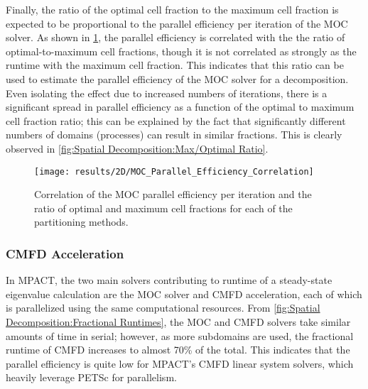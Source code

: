 {{{{        Finally, the ratio of the optimal cell fraction to the maximum cell fraction is expected to be proportional to the parallel efficiency per iteration of the \ac{MOC} solver.
        As shown in \cref{fig:Spatial Decomposition:MOC Parallel Efficiency Correlation}, the parallel efficiency is correlated with the the ratio of optimal-to-maximum cell fractions, though it is not correlated as strongly as the runtime with the maximum cell fraction.
        This indicates that this ratio can be used to estimate the parallel efficiency of the \ac{MOC} solver for a decomposition.
        Even isolating the effect due to increased numbers of iterations, there is a significant spread in parallel efficiency as a function of the optimal to maximum cell fraction ratio; this can be explained by the fact that significantly different numbers of domains (processes) can result in similar fractions.
        This is clearly observed in \cref{fig:Spatial Decomposition:Max/Optimal Ratio}.

        \begin{figure}
          \centering
          \texttt{[image: results/2D/MOC\_Parallel\_Efficiency\_Correlation]}
          \caption{Correlation of the \ac{MOC} parallel efficiency per iteration and the ratio of optimal and maximum cell fractions for each of the partitioning methods. \label{fig:Spatial Decomposition:MOC Parallel Efficiency Correlation}}
        \end{figure}
      }
      \subsubsection{CMFD Acceleration}{\label{sssec:CMFD Acceleration}
        In MPACT, the two main solvers contributing to runtime of a steady-state eigenvalue calculation are the \ac{MOC} solver and \ac{CMFD} acceleration, each of which is parallelized using the same computational resources.
        From \cref{fig:Spatial Decomposition:Fractional Runtimes}, the \ac{MOC} and \ac{CMFD} solvers take similar amounts of time in serial; however, as more subdomains are used, the fractional runtime of \ac{CMFD} increases to almost 70\% of the total.
        This indicates that the parallel efficiency is quite low for MPACT's \ac{CMFD} linear system solvers, which heavily leverage PETSc \cite{Petsc} for parallelism.

}}}}
